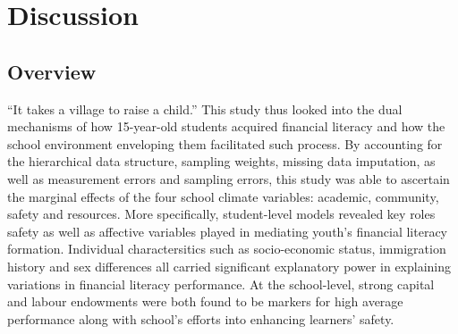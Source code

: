 \documentclass[a4paper,11pt,UKenglish,twoside,openright]{report}\usepackage[]{graphicx}\usepackage[]{color}
\begin{document}










\chapter{Discussion}
\label{chp:5}


\section{Overview}

``It takes a village to raise a child.'' This study thus looked into the dual mechanisms of how 15-year-old students acquired financial literacy and how the school environment enveloping them facilitated such process. By accounting for the hierarchical data structure, sampling weights, missing data imputation, as well as measurement errors and sampling errors, this study was able to ascertain the marginal effects of the four school climate variables: academic, community, safety and resources. More specifically, student-level models revealed key roles safety as well as affective variables played in mediating youth's financial literacy formation. Individual charactersitics such as socio-economic status, immigration history and sex differences all carried significant explanatory power in explaining variations in financial literacy performance. At the school-level, strong capital and labour endowments were both found to be markers for high average performance along with school's efforts into enhancing learners' safety.
\end{document}
